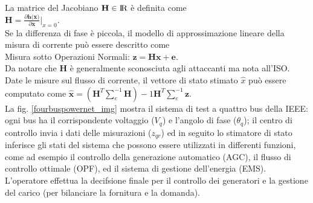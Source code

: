 La matrice del Jacobiano $\textbf{H} \in {\rm I\!R}$ è definita come\\
\indent$\textbf{H}=\frac{\partial\textbf{h(x)}}{\partial\textbf{x}}|_{x=0}$.\\
Se la differenza di fase è piccola, il modello di approssimazione lineare della misura di corrente può essere descritto come\\
\indent Misura sotto Operazioni Normali: $\textbf{z} =  \textbf{Hx} + \textbf{e}$.\\
Da notare che $\textbf{H}$ è generalmente sconosciuta agli attaccanti ma nota all'ISO. Date le misure sul flusso di corrente, il vettore di stato stimato $\widehat{x}$ può essere computato come $\widehat{\textbf{x}} = (\textbf{H}^T\sum_e^{-1}\textbf{H})-1\textbf{H}^T\sum_e^{-1}\textbf{z}$.\\
La fig. \ref{fourbuspowernet_img} mostra il sistema di test a quattro bus della IEEE: ogni bus ha il corrispondente voltaggio ($V_q$) e l'angolo di fase ($\theta_q$); il centro di controllo invia i dati delle misurazioni ($z_{qr}$) ed in seguito lo stimatore di stato inferisce gli stati del sistema che possono essere utilizzati in differenti funzioni, come ad esempio il controllo della generazione automatico (AGC), il flusso di controllo ottimale (OPF), ed il sistema di gestione dell'energia (EMS). L'operatore effettua la decifsione finale per il controllo dei generatori e la gestione del carico (per bilanciare la fornitura e la domanda).
